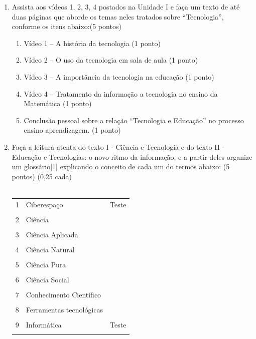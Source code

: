 \documentclass[a4paper, 12pt]{article}
\begin{document}
\begin{enumerate}
\item Assista aos vídeos 1, 2, 3, 4  postados na Unidade I e faça um texto de até duas páginas que aborde os temas neles tratados sobre “Tecnologia”, conforme os itens abaixo:(5 pontos)
  \begin{enumerate}
  \item Vídeo 1 – A história da tecnologia (1 ponto)
  \item Vídeo 2 – O uso da tecnologia em sala de aula (1 ponto)
  \item Vídeo 3 – A importância da tecnologia na educação (1 ponto)
  \item Vídeo 4 – Tratamento da informação a tecnologia no ensino da Matemática (1 ponto)
  \item Conclusão pessoal sobre a relação “Tecnologia e Educação” no processo ensino aprendizagem. (1 ponto)    
  \end{enumerate}
  \item Faça a leitura atenta do texto I  - Ciência e  Tecnologia e   do texto II -  Educação e Tecnologias: o novo ritmo da informação,   e a partir deles organize um glossário[1] explicando o conceito de cada um do termos abaixo: (5 pontos) (0,25 cada) \\ \\
    \begin{tabular}{|m{0.5cm}|m{5cm}|m{8cm}|}
      \hline
      1 & Ciberespaço & Teste \\ \\
      \hline
      2 & Ciência & \\ \\
      \hline
      3 & Ciência Aplicada & \\ \\
      \hline
      4 & Ciência Natural & \\ \\
      \hline
      5 & Ciência Pura & \\ \\
      \hline
      6 & Ciência Social & \\ \\
      \hline
      7 & Conhecimento Científico & \\ \\
      \hline
      8 & Ferramentas tecnológicas & \\ \\
      \hline
      9 & Informática & Teste & \\ \\

\end{tabular}
\end{enumerate}
\end{document}
